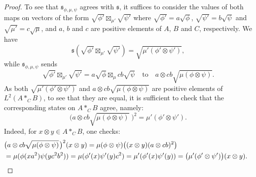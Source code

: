 \documentclass[10pt,a4paper]{amsart}
\newcommand{\Ltwomap}{\mathfrak{s}}
\newcommand{\cofu}[1]{\mathop{\boxtimes}_{#1}}
\begin{document}
\begin{proof}
To see that $ \Ltwomap_{\phi,\mu,\psi}$ agrees with $\Ltwomap$, it suffices to consider the values of both maps on vectors of the form $\sqrt{\phi'} \cofu{\mu'}\sqrt{\psi'}$ where $\sqrt{\phi'}=a\sqrt{\phi}$, $\sqrt{\psi'}=b\sqrt{\psi}$ and $\sqrt{\mu'}=c\sqrt{\mu}$, and $a$, $b$ and $c$ are positive elements of $A$, $B$ and $C$, respectively. We have
$$
\Ltwomap(\sqrt{\phi'} \cofu{\mu'}\sqrt{\psi'})=\sqrt{\mu'(\phi' \otimes \psi')},
$$
while $ \Ltwomap_{\phi,\mu,\psi}$ sends 
$$
\sqrt{\phi'} \cofu{\mu'}\sqrt{\psi'}=a\sqrt{\phi} \cofu{\mu}cb\sqrt{\psi}\quad\text{to}\quad  a\otimes cb \sqrt{\mu(\phi \otimes \psi)}.
$$
As both $\sqrt{\mu'(\phi' \otimes \psi')}$ and $a\otimes cb \sqrt{\mu(\phi \otimes \psi)}$ are positive elements of $L^2(A \ast_{C}B)$, to see that they are equal, it is sufficient to check that the corresponding states on $A \ast_{C}B$ agree, namely:
\[
\big(a\otimes cb \sqrt{\mu(\phi \otimes \psi)}\;\!\big)^2=\mu'(\phi' \otimes \psi').
\]
Indeed, for $x\otimes y \in A \ast_{C}B$, one checks:
    \begin{align*}
    \!\!&\!\!\big(a\otimes cb \sqrt{\mu(\phi \otimes \psi)}\;\!\big)^2(x\otimes y)=
        \mu(\phi \otimes \psi)\big( (x\otimes y)(a\otimes cb)^2\big) \\
    \!\!&\!\!=\mu(\phi(x a^2)\psi(y c^2b^2))
        =\mu(\phi'(x)\psi'(y)c^2)
         =\mu'(\phi'(x)\psi'(y))=
         \big(\mu'(\phi' \otimes \psi')\big)(x\otimes y).\qedhere
    \end{align*}
\end{proof}
\end{document}
